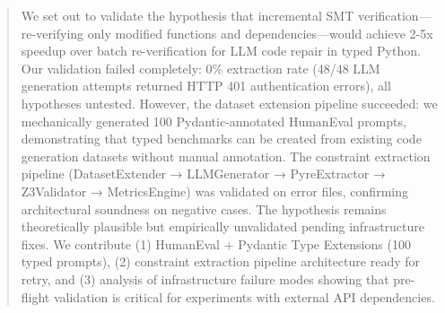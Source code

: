 \begin{abstract}
We set out to validate the hypothesis that incremental SMT verification---re-verifying only modified functions and dependencies---would achieve 2-5x speedup over batch re-verification for LLM code repair in typed Python. Our validation failed completely: 0\% extraction rate (48/48 LLM generation attempts returned HTTP 401 authentication errors), all hypotheses untested. However, the dataset extension pipeline succeeded: we mechanically generated 100 Pydantic-annotated HumanEval prompts, demonstrating that typed benchmarks can be created from existing code generation datasets without manual annotation. The constraint extraction pipeline (DatasetExtender → LLMGenerator → PyreExtractor → Z3Validator → MetricsEngine) was validated on error files, confirming architectural soundness on negative cases. The hypothesis remains theoretically plausible but empirically unvalidated pending infrastructure fixes. We contribute (1) HumanEval + Pydantic Type Extensions (100 typed prompts), (2) constraint extraction pipeline architecture ready for retry, and (3) analysis of infrastructure failure modes showing that pre-flight validation is critical for experiments with external API dependencies.
\end{abstract}
